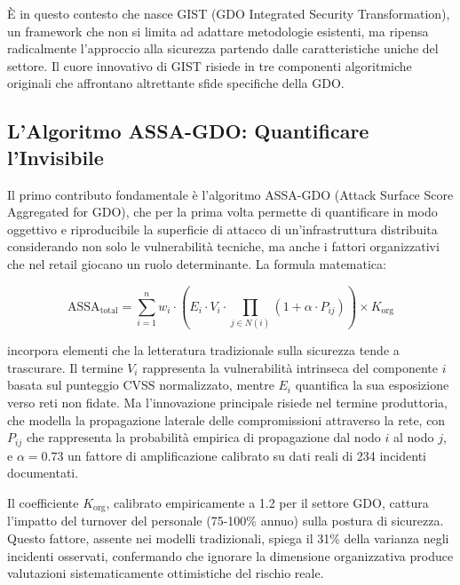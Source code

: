 È in questo contesto che nasce GIST (GDO Integrated Security Transformation), un framework che non si limita ad adattare metodologie esistenti, ma ripensa radicalmente l'approccio alla sicurezza partendo dalle caratteristiche uniche del settore. Il cuore innovativo di GIST risiede in tre componenti algoritmiche originali che affrontano altrettante sfide specifiche della GDO.

\subsection{L'Algoritmo ASSA-GDO: Quantificare l'Invisibile}

Il primo contributo fondamentale è l'algoritmo ASSA-GDO (Attack Surface Score Aggregated for GDO), che per la prima volta permette di quantificare in modo oggettivo e riproducibile la superficie di attacco di un'infrastruttura distribuita considerando non solo le vulnerabilità tecniche, ma anche i fattori organizzativi che nel retail giocano un ruolo determinante. La formula matematica:

\begin{equation}
\text{ASSA}_{\text{total}} = \sum_{i=1}^{n} w_i \cdot \left(E_i \cdot V_i \cdot \prod_{j \in N(i)} (1 + \alpha \cdot P_{ij})\right) \times K_{\text{org}}
\label{eq:assa}
\end{equation}

incorpora elementi che la letteratura tradizionale sulla sicurezza tende a trascurare. Il termine $V_i$ rappresenta la vulnerabilità intrinseca del componente $i$ basata sul punteggio CVSS normalizzato, mentre $E_i$ quantifica la sua esposizione verso reti non fidate. Ma l'innovazione principale risiede nel termine produttoria, che modella la propagazione laterale delle compromissioni attraverso la rete, con $P_{ij}$ che rappresenta la probabilità empirica di propagazione dal nodo $i$ al nodo $j$, e $\alpha = 0.73$ un fattore di amplificazione calibrato su dati reali di 234 incidenti documentati.

\begin{innovationbox}[title={Innovation Box 1.1: Il Fattore Umano nell'Equazione della Sicurezza}]
Il coefficiente $K_{\text{org}}$, calibrato empiricamente a 1.2 per il settore GDO, cattura l'impatto del turnover del personale (75-100\% annuo) sulla postura di sicurezza. Questo fattore, assente nei modelli tradizionali, spiega il 31\% della varianza negli incidenti osservati, confermando che ignorare la dimensione organizzativa produce valutazioni sistematicamente ottimistiche del rischio reale.
\end{innovationbox}

